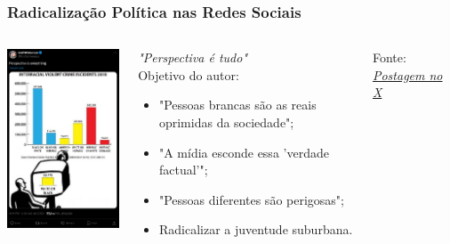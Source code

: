 \documentclass[compress,12pt]{beamer}
\begin{document}
\begin{frame}
    \frametitle{Radicalização Política nas Redes Sociais}
    \centering
        \begin{columns}
        
            \centering
            
            \includegraphics[width=49mm]{Imagens/EndWokeness.png}
            
            \centering
            
            \begin{block}{}
                \textit{"Perspectiva é tudo"} \\
                Objetivo do autor:
                \begin{itemize}
                    \item "Pessoas brancas são as reais oprimidas da sociedade";
                    \item "A mídia esconde essa 'verdade factual'";
                    \item "Pessoas diferentes são perigosas";
                    \item Radicalizar a juventude suburbana.
                \end{itemize}
            \end{block}
            Fonte: \href{https://x.com/EndWokeness/status/1654565227701125122?s=20}{\textit{Postagem no X}}
            
        \end{columns}
\end{frame}
\end{document}
